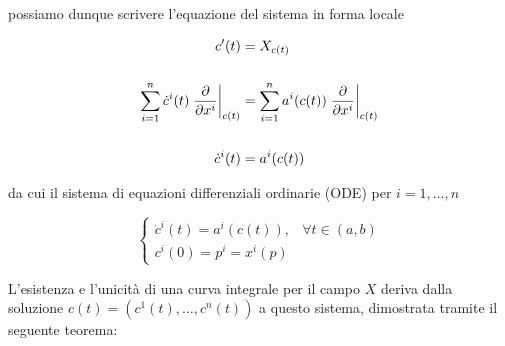 possiamo dunque scrivere l'equazione del sistema in forma locale

\begin{align}
	\begin{split}
		c'(t) &= X_{c(t)} \\ \\
		\sum_{i=1}^{n} \dot{c}^{i}(t) \eval{ \pdv{x^{i}} }_{c(t)} &= \sum_{i=1}^{n} a^{i}(c(t)) \eval{ \pdv{x^{i}} }_{c(t)} \\ \\
		\dot{c}^{i}(t) &= a^{i}(c(t))
	\end{split}
\end{align}

da cui il sistema di equazioni differenziali ordinarie (ODE) per $ i=1,\dots,n $

\begin{equation}
	\begin{cases}
		\dot{c}^{i}(t) = a^{i}(c(t)), & \forall t \in (a,b) \\
		c^{i}(0) = p^{i} = x^{i} (p)
	\end{cases}
\end{equation}

L'esistenza e l'unicità di una curva integrale per il campo $ X $ deriva dalla soluzione $ c(t) = (c^{1}(t),\dots,c^{n}(t)) $ a questo sistema, dimostrata tramite il seguente teorema:

